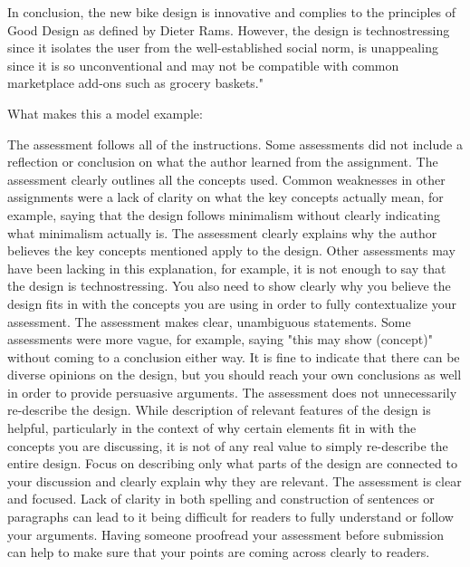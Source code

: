 \documentclass{article}
\begin{document}
In conclusion, the new bike design is innovative and complies to the principles of Good Design as defined by Dieter Rams. However, the design is technostressing since it isolates the user from the well-established social norm, is unappealing since it is so unconventional and may not be compatible with common marketplace add-ons such as grocery baskets."

What makes this a model example:

The assessment follows all of the instructions. Some assessments did not include a reflection or conclusion on what the author learned from the assignment.
The assessment clearly outlines all the concepts used. Common weaknesses in other assignments were a lack of clarity on what the key concepts actually mean, for example, saying that the design follows minimalism without clearly indicating what minimalism actually is.
The assessment clearly explains why the author believes the key concepts mentioned apply to the design. Other assessments may have been lacking in this explanation, for example, it is not enough to say that the design is technostressing. You also need to show clearly why you believe the design fits in with the concepts you are using in order to fully contextualize your assessment.
The assessment makes clear, unambiguous statements. Some assessments were more vague, for example, saying "this may show (concept)" without coming to a conclusion either way. It is fine to indicate that there can be diverse opinions on the design, but you should reach your own conclusions as well in order to provide persuasive arguments.
The assessment does not unnecessarily re-describe the design. While description of relevant features of the design is helpful, particularly in the context of why certain elements fit in with the concepts you are discussing, it is not of any real value to simply re-describe the entire design. Focus on describing only what parts of the design are connected to your discussion and clearly explain why they are relevant.
The assessment is clear and focused. Lack of clarity in both spelling and construction of sentences or paragraphs can lead to it being difficult for readers to fully understand or follow your arguments. Having someone proofread your assessment before submission can help to make sure that your points are coming across clearly to readers.
\end{document}
